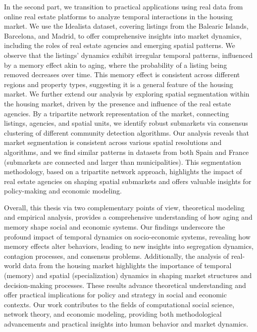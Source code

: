 In the second part, we transition to practical applications using real data from online real estate platforms to analyze temporal interactions in the housing market. We use the Idealista dataset, covering listings from the Balearic Islands, Barcelona, and Madrid, to offer comprehensive insights into market dynamics, including the roles of real estate agencies and emerging spatial patterns. We observe that the listings' dynamics exhibit irregular temporal patterns, influenced by a memory effect akin to aging, where the probability of a listing being removed decreases over time. This memory effect is consistent across different regions and property types, suggesting it is a general feature of the housing market. We further extend our analysis by exploring spatial segmentation within the housing market, driven by the presence and influence of the real estate agencies. By a tripartite network representation of the market, connecting listings, agencies, and spatial units, we identify robust submarkets via consensus clustering of different community detection algorithms. Our analysis reveals that market segmentation is consistent across various spatial resolutions and algorithms, and we find similar patterns in datasets from both Spain and France (submarkets are connected and larger than municipalities). This segmentation methodology, based on a tripartite network approach, highlights the impact of real estate agencies on shaping spatial submarkets and offers valuable insights for policy-making and economic modeling.

Overall, this thesis via two complementary points of view, theoretical modeling and empirical analysis, provides a comprehensive understanding of how aging and memory shape social and economic systems. Our findings underscore the profound impact of temporal dynamics on socio-economic systems, revealing how memory effects alter behaviors, leading to new insights into segregation dynamics, contagion processes, and consensus problems. Additionally, the analysis of real-world data from the housing market highlights the importance of temporal (memory) and spatial (specialization) dynamics in shaping market structures and decision-making processes. These results advance theoretical understanding and offer practical implications for policy and strategy in social and economic contexts. Our work contributes to the fields of computational social science, network theory, and economic modeling, providing both methodological advancements and practical insights into human behavior and market dynamics.


\vfill